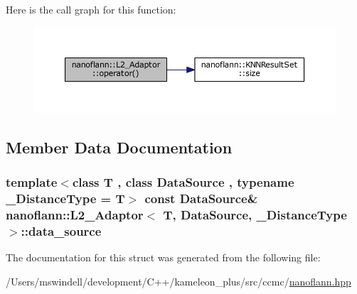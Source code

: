 Here is the call graph for this function\-:
\nopagebreak
\begin{figure}[H]
\begin{center}
\leavevmode
\includegraphics[width=350pt]{structnanoflann_1_1_l2___adaptor_a70fe24865199691cf988d83ccc76cee8_cgraph}
\end{center}
\end{figure}




\subsection{Member Data Documentation}
\hypertarget{structnanoflann_1_1_l2___adaptor_aa108fd57fd3336ea825cb62f7f5b531b}{
\subsubsection[{data\-\_\-source}]{\setlength{\rightskip}{0pt plus 5cm}template$<$class T , class Data\-Source , typename \-\_\-\-Distance\-Type  = T$>$ const Data\-Source\& {\bf nanoflann\-::\-L2\-\_\-\-Adaptor}$<$ T, Data\-Source, \-\_\-\-Distance\-Type $>$\-::data\-\_\-source}}\label{structnanoflann_1_1_l2___adaptor_aa108fd57fd3336ea825cb62f7f5b531b}


The documentation for this struct was generated from the following file\-:\begin{DoxyCompactItemize}
\item 
/\-Users/mswindell/development/\-C++/kameleon\-\_\-plus/src/ccmc/\hyperlink{nanoflann_8hpp}{nanoflann.\-hpp}\end{DoxyCompactItemize}
